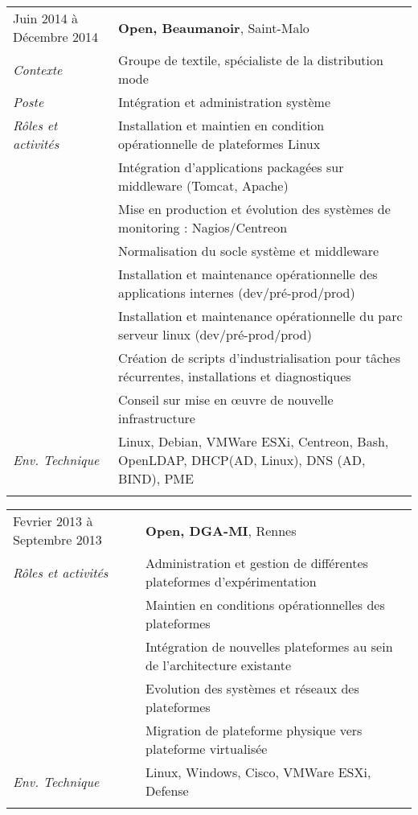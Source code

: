 \documentclass[a4paper]{article}
\begin{document}
\begin{tabular}{P{3.5cm}|p{13cm}}
Juin 2014 à Décembre 2014	& \textbf{Open, Beaumanoir}, Saint-Malo\\
\textsl{Contexte}		& Groupe de textile, spécialiste de la distribution mode\\
\textsl{Poste}			& Intégration et administration système\\
\textsl{Rôles et activités}	& Installation et maintien en condition opérationnelle de plateformes Linux\\
				& Intégration d'applications packagées sur middleware (Tomcat, Apache)\\
				& Mise en production et évolution des systèmes de monitoring : Nagios/Centreon\\
				& Normalisation du socle système et middleware\\
				& Installation et maintenance opérationnelle des applications internes (dev/pré-prod/prod)\\
				& Installation et maintenance opérationnelle du parc serveur linux (dev/pré-prod/prod)\\
				& Création de scripts d'industrialisation pour tâches récurrentes, installations et diagnostiques\\
				& Conseil sur mise en œuvre de nouvelle infrastructure\\
\textsl{Env. Technique}		& Linux, Debian, VMWare ESXi, Centreon, Bash, OpenLDAP, DHCP(AD, Linux), DNS (AD, BIND), PME\\
 & \\
\end{tabular}

\begin{tabular}{P{3.5cm}|p{13cm}}
Fevrier 2013 à Septembre 2013	& \textbf{Open, DGA-MI}, Rennes\\
\textsl{Rôles et activités}	& Administration et gestion de différentes plateformes d'expérimentation\\
				& Maintien en conditions opérationnelles des plateformes\\
				& Intégration de nouvelles plateformes au sein de l'architecture existante\\
				& Evolution des systèmes et réseaux des plateformes\\
				& Migration de plateforme physique vers plateforme virtualisée\\
\textsl{Env. Technique}		& Linux, Windows, Cisco, VMWare ESXi, Defense\\
 & \\
\end{tabular}
\end{document}
